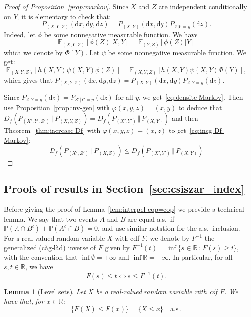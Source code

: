 \documentclass[12pt]{article}
\newcommand{\E}{{\mathbb E}}
\renewcommand{\P}{{\mathbb P}}
\newcommand{\R}{{\mathbb R}}
\newcommand{\rd}{\mathrm{d}}
\theoremstyle{plain}
\newtheorem{lem}[theo]{Lemma}
\theoremstyle{remark}
\begin{document}
\begin{proof}[Proof of Proposition~\ref{prop:markov}]
Since $X$ and $Z$ are independent conditionally on $Y$, it is elementary
to check that:
\[
  P_{(X,Y,Z)}(\rd x, \rd y, \rd z)= P_{(X,Y)}(\rd x , \rd y)
  P_{Z|Y=y}(\rd z).
\]
  Indeed, let $\phi$  be some nonnegative measurable function.
We have
$$
\E_{(X,Y,Z)}[\phi(Z)|X,Y]=\E_{(Y,Z)}[\phi(Z)|Y]
$$ which we
denote by  $\Phi(Y)$.
 Let $\psi$  be some nonnegative measurable function. We get:
 \[
    \E_{(X,Y,Z)}\left[ h(X,Y) \psi(X,Y) \phi(Z)\right]
   =    \E_{(X,Y,Z)}\left[ h(X,Y) \psi(X,Y) \Phi(Y)\right],
 \]
 which gives that $ P_{(X,Y,Z)}(\rd x, \rd y, \rd z)= P_{(X,Y)}(\rd x , \rd y)
  P_{Z|Y=y}(\rd z)$.


Since  $  P_{Z|Y=y}(\rd   z)=  P_{Z'|Y'=y}(\rd  z)$  for   all  $y$,  we
get~\eqref{eq:densite-Markov}.  Then use  Proposition~\ref{prop:inv-gen}
with         $\varphi(x,y,z)=(x,y)$        to         deduce        that
$   D_f\left(P_{(X',    Y',   Z')}   \,\Vert    \,   P_{(X,Y,Z)}\right)=
D_f\left(P_{(X',   Y')}  \,   \Vert   \,   P_{(X,Y)}\right)$  and   then
Theorem~\ref{thm:increase-Df}     with     $\varphi(x,y,z)=(x,z)$     to
get~\eqref{eq:ineg-Df-Markov}:
$$
  D_f\left(P_{(X',  Z')}   \,\Vert    \,   P_{(X,Z)}\right) \leq
D_f\left(P_{(X',   Y')}  \,   \Vert   \,   P_{(X,Y)}\right)
$$ 
\end{proof}



\subsection{Proofs of results in Section~\ref{sec:csiszar_index}}
\label{sec:proofs_copula}


Before giving the proof of Lemma~\ref{lem:interpol-cop=cop} we provide a
technical lemma. We say  that two events $A$ and $B$  are equal a.s.\ if
$\P(A\cap B^c)+\P(A^c \cap  B)=0$, and use similar notation for the
a.s.\ inclusion.  For  a real-valued random
 variable $X$ with cdf $F$,  we denote by $F^{-1}$  the  generalized (c\`ag-l\`ad)  inverse of  $F$ given  by
  $F^{-1}(t)=\inf\{  s\in  \R  \,   \colon\,  F(s)\geq  t\}$,  with  the
  convention that $\inf \emptyset=+\infty $  and $\inf \R=-\infty $.
 In particular, for
  all $s,  t\in \R$, we have:
  \begin{equation}
      \label{eq:F-1}
      F(s)\leq  t \Longleftrightarrow s\leq   F^{-1} (t).
  \end{equation}
\begin{lem}[Level sets]
  \label{lem:X-FX}
  Let $X$ be a real-valued  random variable with cdf $F$. We have that, for  $x\in \R$:
 \begin{equation}
    \label{eq:F-2}
  \{F(X) \leq  F(x)\}=  \{X\leq  x\} %
    \quad\text{a.s.}.
  \end{equation}
\end{lem}
\end{document}
